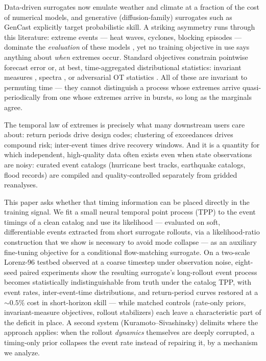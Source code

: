 \documentclass[11pt]{article}
\begin{document}
Data-driven surrogates now emulate weather and climate at a fraction of the
cost of numerical models, and generative (diffusion-family) surrogates such
as GenCast \citep{price2025probabilistic} explicitly target probabilistic
skill. A striking asymmetry runs through this literature: extreme events ---
heat waves, cyclones, blocking episodes --- dominate the \emph{evaluation} of
these models \citep{price2025probabilistic,wattmeyer2025ace2,kochkov2024neural},
yet no training objective in use says anything about \emph{when} extremes
occur. Standard objectives constrain pointwise forecast error or, at best,
time-aggregated distributional statistics: invariant measures
\citep{jiang2023training,schiff2024dyslim}, spectra
\citep{chakraborty2026binned}, or adversarial OT statistics
\citep{melo2026learning}. All of these are invariant to permuting time ---
they cannot distinguish a process whose extremes arrive quasi-periodically
from one whose extremes arrive in bursts, so long as the marginals agree.

The temporal law of extremes is precisely what many downstream users care
about: return periods drive design codes; clustering of exceedances drives
compound risk; inter-event times drive recovery windows. And it is a
quantity for which independent, high-quality data often exists even when
state observations are noisy: curated event catalogs (hurricane best tracks,
earthquake catalogs, flood records) are compiled and quality-controlled
separately from gridded reanalyses.

This paper asks whether that timing information can be placed directly in
the training signal. We fit a small neural temporal point process (TPP) to
the event timings of a clean catalog and use its likelihood --- evaluated
on soft, differentiable events extracted from short surrogate rollouts,
via a likelihood-ratio construction that we show is necessary to avoid
mode collapse --- as an auxiliary fine-tuning objective for a conditional
flow-matching surrogate. On a two-scale Lorenz-96 testbed observed at a
coarse timestep under observation noise, eight-seed paired experiments
show the resulting surrogate's long-rollout event process becomes
statistically indistinguishable from truth under the catalog TPP, with
event rates, inter-event-time distributions, and return-period curves
restored at a ${\sim}0.5\%$ cost in short-horizon skill --- while matched
controls (rate-only priors, invariant-measure objectives, rollout
stabilizers) each leave a characteristic part of the deficit in place. A
second system (Kuramoto--Sivashinsky) delimits where the approach applies:
when the rollout \emph{dynamics} themselves are deeply corrupted, a
timing-only prior collapses the event rate instead of repairing it, by a
mechanism we analyze.
\end{document}
